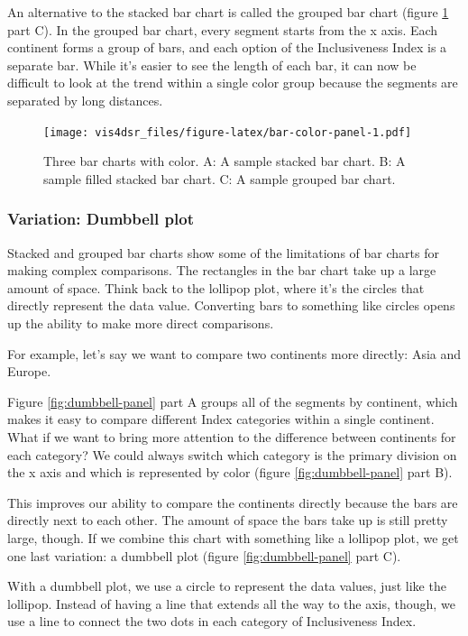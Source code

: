 \documentclass[
]{krantz}
\begin{document}
An alternative to the stacked bar chart is called the grouped bar chart (figure
\ref{fig:bar-color-panel} part C). In the grouped bar chart, every segment starts
from the x axis. Each continent forms a group of bars, and each option of the
Inclusiveness Index is a separate bar. While it's easier to see the length of
each bar, it can now be difficult to look at the trend within a single color group
because the segments are separated by long distances.

\begin{figure}
\centering
\texttt{[image: vis4dsr\_files/figure-latex/bar-color-panel-1.pdf]}
\caption{\label{fig:bar-color-panel}Three bar charts with color. A: A sample stacked bar chart. B: A sample filled stacked bar chart. C: A sample grouped bar chart.}
\end{figure}

\hypertarget{variation-dumbbell-plot}{%
\subsubsection{Variation: Dumbbell plot}\label{variation-dumbbell-plot}}

Stacked and grouped bar charts show some of the limitations of bar charts for
making complex comparisons. The rectangles in the bar chart take up a large amount
of space. Think back to the lollipop plot, where it's the circles that directly
represent the data value. Converting bars to something like circles opens up the
ability to make more direct comparisons.

For example, let's say we want to compare two continents more directly: Asia and Europe.

Figure \ref{fig:dumbbell-panel} part A groups all of the segments by continent,
which makes it easy to compare different Index categories within a single continent.
What if we want to bring more attention to the difference between continents for
each category? We could always switch which category is the primary division on
the x axis and which is represented by color (figure \ref{fig:dumbbell-panel} part B).

This improves our ability to compare the continents directly because the bars are
directly next to each other. The amount of space the bars take up is still pretty
large, though. If we combine this chart with something like a lollipop plot, we
get one last variation: a dumbbell plot (figure \ref{fig:dumbbell-panel} part C).

With a dumbbell plot, we use a circle to represent the data values, just like the
lollipop. Instead of having a line that extends all the way to the axis, though,
we use a line to connect the two dots in each category of Inclusiveness Index.
\end{document}

